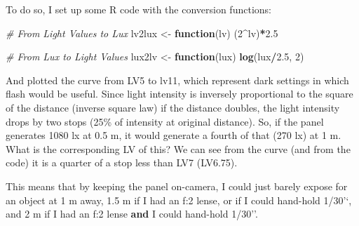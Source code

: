 \documentclass[
]{article}
\newenvironment{Shaded}{\begin{snugshade}}{\end{snugshade}}
\newcommand{\CommentTok}[1]{\textcolor[rgb]{0.56,0.35,0.01}{\textit{#1}}}
\newcommand{\ControlFlowTok}[1]{\textcolor[rgb]{0.13,0.29,0.53}{\textbf{#1}}}
\newcommand{\DecValTok}[1]{\textcolor[rgb]{0.00,0.00,0.81}{#1}}
\newcommand{\FloatTok}[1]{\textcolor[rgb]{0.00,0.00,0.81}{#1}}
\newcommand{\KeywordTok}[1]{\textcolor[rgb]{0.13,0.29,0.53}{\textbf{#1}}}
\newcommand{\NormalTok}[1]{#1}
\newcommand{\OperatorTok}[1]{\textcolor[rgb]{0.81,0.36,0.00}{\textbf{#1}}}
\newcommand{\StringTok}[1]{\textcolor[rgb]{0.31,0.60,0.02}{#1}}
\begin{document}
To do so, I set up some R code with the conversion functions:

\begin{Shaded}
\begin{Highlighting}[]
\CommentTok{# From Light Values to Lux}
\NormalTok{lv2lux <-}\StringTok{ }\ControlFlowTok{function}\NormalTok{(lv) (}\DecValTok{2}\OperatorTok{^}\NormalTok{lv)}\OperatorTok{*}\FloatTok{2.5}  

\CommentTok{# From Lux to Light Values}
\NormalTok{lux2lv <-}\StringTok{ }\ControlFlowTok{function}\NormalTok{(lux) }\KeywordTok{log}\NormalTok{(lux}\OperatorTok{/}\FloatTok{2.5}\NormalTok{, }\DecValTok{2}\NormalTok{)}
\end{Highlighting}
\end{Shaded}

And plotted the curve from LV5 to lv11, which represent dark settings in
which flash would be useful. Since light intensity is inversely
proportional to the square of the distance (inverse square law) if the
distance doubles, the light intensity drops by two stops (25\% of
intensity at original distance). So, if the panel generates 1080 lx at
0.5 m, it would generate a fourth of that (270 lx) at 1 m. What is the
corresponding LV of this? We can see from the curve (and from the code)
it is a quarter of a stop less than LV7 (LV6.75).

This means that by keeping the panel on-camera, I could just barely
expose for an object at 1 m away, 1.5 m if I had an f:2 lense, or if I
could hand-hold 1/30'`, and 2 m if I had an f:2 lense \textbf{and} I
could hand-hold 1/30''.
\end{document}
